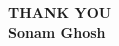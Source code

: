 
\thispagestyle{empty}

\begin{center}
{\LARGE {\bf THANK YOU}}\\
\vspace{0.5in}
{\large {\bf Sonam Ghosh}}
\end{center}



